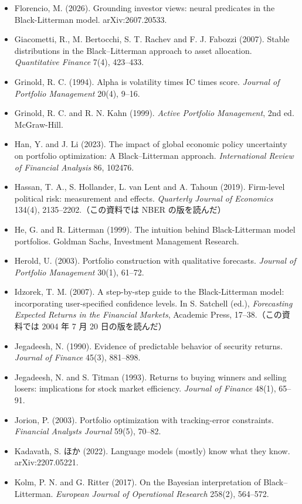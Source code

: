 {\begin{itemize}[leftmargin=1.2em,itemsep=0.25em,label={}]
\item Florencio, M. (2026). Grounding investor views: neural predicates in the Black-Litterman model. arXiv:2607.20533.
\item Giacometti, R., M. Bertocchi, S. T. Rachev and F. J. Fabozzi (2007). Stable distributions in the Black--Litterman approach to asset allocation. \textit{Quantitative Finance} 7(4), 423--433.
\item Grinold, R. C. (1994). Alpha is volatility times IC times score. \textit{Journal of Portfolio Management} 20(4), 9--16.
\item Grinold, R. C. and R. N. Kahn (1999). \textit{Active Portfolio Management}, 2nd ed. McGraw-Hill.
\item Han, Y. and J. Li (2023). The impact of global economic policy uncertainty on portfolio optimization: A Black--Litterman approach. \textit{International Review of Financial Analysis} 86, 102476.
\item Hassan, T. A., S. Hollander, L. van Lent and A. Tahoun (2019). Firm-level political risk: measurement and effects. \textit{Quarterly Journal of Economics} 134(4), 2135--2202.（この資料では NBER の版を読んだ）
\item He, G. and R. Litterman (1999). The intuition behind Black-Litterman model portfolios. Goldman Sachs, Investment Management Research.
\item Herold, U. (2003). Portfolio construction with qualitative forecasts. \textit{Journal of Portfolio Management} 30(1), 61--72.
\item Idzorek, T. M. (2007). A step-by-step guide to the Black-Litterman model: incorporating user-specified confidence levels. In S. Satchell (ed.), \textit{Forecasting Expected Returns in the Financial Markets}, Academic Press, 17--38.（この資料では 2004 年 7 月 20 日の版を読んだ）
\item Jegadeesh, N. (1990). Evidence of predictable behavior of security returns. \textit{Journal of Finance} 45(3), 881--898.
\item Jegadeesh, N. and S. Titman (1993). Returns to buying winners and selling losers: implications for stock market efficiency. \textit{Journal of Finance} 48(1), 65--91.
\item Jorion, P. (2003). Portfolio optimization with tracking-error constraints. \textit{Financial Analysts Journal} 59(5), 70--82.
\item Kadavath, S. ほか (2022). Language models (mostly) know what they know. arXiv:2207.05221.
\item Kolm, P. N. and G. Ritter (2017). On the Bayesian interpretation of Black--Litterman. \textit{European Journal of Operational Research} 258(2), 564--572.

\end{itemize}}
